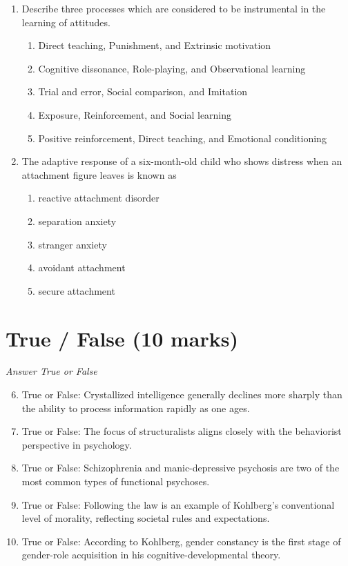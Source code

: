 \documentclass[12pt]{article}
\begin{document}
\begin{enumerate}[label=\arabic*.]
\begin{enumerate}[label=(\alph*)]
    \item Beck Scale for Suicidal Ideation
\end{enumerate}
\item Describe three processes which are considered to be instrumental in the learning of
attitudes.
\begin{enumerate}[label=(\alph*)]
    \item Direct teaching, Punishment, and Extrinsic motivation
    \item Cognitive dissonance, Role-playing, and Observational learning
    \item Trial and error, Social comparison, and Imitation
    \item Exposure, Reinforcement, and Social learning
    \item Positive reinforcement, Direct teaching, and Emotional conditioning
\end{enumerate}
\item The adaptive response of a six-month-old child who shows distress when an attachment
figure leaves is known as
\begin{enumerate}[label=(\alph*)]
    \item reactive attachment disorder
    \item separation anxiety
    \item stranger anxiety
    \item avoidant attachment
    \item secure attachment
\end{enumerate}
\end{enumerate}

\section*{True / False (10 marks)}
\textit{Answer True or False}
\begin{enumerate}[label=\arabic*.]
\setcounter{enumi}{5}
\item True or False: Crystallized intelligence generally declines more sharply than the ability to process information rapidly as one ages.
\item True or False: The focus of structuralists aligns closely with the behaviorist perspective in psychology.
\item True or False: Schizophrenia and manic-depressive psychosis are two of the most common types of functional psychoses.
\item True or False: Following the law is an example of Kohlberg's conventional level of morality, reflecting societal rules and expectations.
\item True or False: According to Kohlberg, gender constancy is the first stage of gender-role acquisition in his cognitive-developmental theory.
\end{enumerate}
\end{document}
